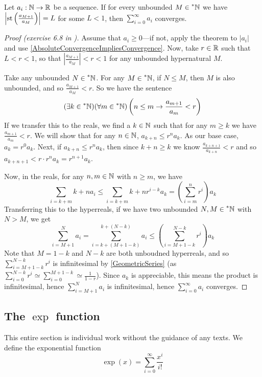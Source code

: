 \begin{thm}\label{RatioTest}
    Let $a_i: \mathbb{N} \to \mathbb{R}$ be a sequence. If for every unbounded $M \in \prescript{*}{}{\mathbb{N}}$ we have $\left|\operatorname{st}\left(\frac{a_{M+1}}{a_M}\right)\right| = L$ for some $L < 1$, then $\sum_{i=0}^\infty a_i$ converges.
\end{thm}

\begin{proof}[Proof (exercise 6.8 in \cite{goldblatt1998})]
    Assume that $a_i \geq 0$---if not, apply the theorem to $|a_i|$ and use \ref{AbsoluteConvergenceImpliesConvergence}. Now, take $r \in \mathbb{R}$ such that $L < r < 1$, so that $\left|\frac{a_{M+1}}{a_M}\right| < r < 1$ for any unbounded hypernatural $M$.

    Take any unbounded $N \in \prescript{*}{}{\mathbb{N}}$. For any $M \in \prescript{*}{}{\mathbb{N}}$, if $N \leq M$, then $M$ is also unbounded, and so $\frac{a_{M+1}}{a_M} < r$. So we have the sentence
    \[ (\exists k \in \prescript{*}{}{\mathbb{N}})(\forall m \in \prescript{*}{}{\mathbb{N}})\left(n \leq m \to \frac{a_{m+1}}{a_m} < r\right) \]
    If we transfer this to the reals, we find a $k \in \mathbb{N}$ such that for any $m \geq k$ we have $\frac{a_{m+1}}{a_m} < r$. We will show that for any $n \in \mathbb{N}$, $a_{k+n} \leq r^n a_k$. As our base case, $a_k = r^0 a_k$. Next, if $a_{k+n} \leq r^n a_k$, then since $k+n \geq k$ we know $\frac{a_{k+n+1}}{a_{k+n}} < r$ and so $a_{k+n+1} < r \cdot r^n a_k = r^{n+1}a_k$.

    Now, in the reals, for any $n, m \in \mathbb{N}$ with $n \geq m$, we have 
    \[ \sum_{i=k+m}{k+n} a_i \leq \sum_{i=k+m}{k+n} r^{i-k} a_k = \left(\sum_{i=m}^n r^i\right) a_k \]
    Transferring this to the hyperreals, if we have two unbounded $N, M \in \prescript{*}{}{\mathbb{N}}$ with $N > M$, we get
    \[ \sum_{i=M+1}^N a_i = \sum_{i=k+(M+1-k)}^{k+(N-k)} a_i \leq \left(\sum_{i=M+1-k}^{N-k} r^i \right) a_k \]
    Note that $M=1-k$ and $N-k$ are both unboudned hyperreals, and so $\sum_{i=M+1-k}^{N-k} r^i$ is infinitesimal by \ref{GeometricSeries} (as $\sum_{i=0}^{N-k} r^i \simeq \sum_{i=0}^{M+1-k} \simeq \frac{1}{1-r}$). Since $a_k$ is appreciable, this means the product is infinitesimal, hence $\sum_{i=M+1}^N a_i$ is infinitesimal, hence $\sum_{i=0}^\infty a_i$ converges.
\end{proof}

\subsection{The $\exp$ function}
This entire section is individual work without the guidance of any texts. We define the exponential function \[\exp(x) = \sum_{i=0}^\infty \frac{x^i}{i!}\]

